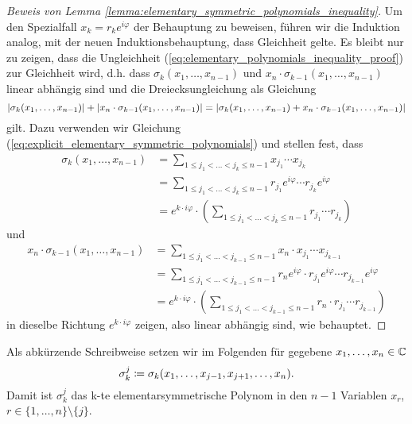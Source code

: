 \begin{proof}[Beweis von Lemma \ref{lemma:elementary_symmetric_polynomials_inequality}]
    Um den Spezialfall $x_k = r_k e^{i \varphi}$ der Behauptung zu beweisen,
    führen wir die Induktion analog, mit der neuen Induktionsbehauptung, dass
    Gleichheit gelte.  Es bleibt nur zu zeigen, dass die Ungleichheit
    (\ref{eq:elementary_polynomials_inequality_proof}) zur Gleichheit wird, d.h. dass
    $\sigma_{k}(x_1, \dots, x_{n-1})$ und $x_n \cdot \sigma_{k-1}(x_1, \dots, x_{n-1})$
    linear abhängig sind und die Dreiecksungleichung als Gleichung
    \[
        \left\lvert \sigma_{k}(x_1, \dots, x_{n-1}) \right\rvert + \left\lvert x_n \cdot \sigma_{k-1}(x_1, \dots, x_{n-1}) \right\rvert
        = \left\lvert \sigma_{k}(x_1, \dots, x_{n-1}) + x_n \cdot \sigma_{k-1}(x_1, \dots, x_{n-1}) \right\rvert
    \]
    gilt.
    Dazu verwenden wir Gleichung
    (\ref{eq:explicit_elementary_symmetric_polynomials}) und stellen fest, dass
    \begin{equation*}
        \begin{split}
            \sigma_{k}(x_1, \dots, x_{n-1})
            &= \sum_{1 \leq j_1 < \dots < j_k \leq n-1} x_{j_1} \cdots x_{j_k}\\
            &= \sum_{1 \leq j_1 < \dots < j_k \leq n-1} r_{j_1} e^{i\varphi} \cdots r_{j_k} e^{i\varphi}\\
            &= e^{k\cdot i\varphi} \cdot \left( \sum_{1 \leq j_1 < \dots < j_k \leq n-1} r_{j_1} \cdots r_{j_k} \right)
        \end{split}
    \end{equation*}
    und
    \begin{equation*}
        \begin{split}
            x_n \cdot \sigma_{k-1}(x_1, \dots, x_{n-1})
            &= \sum_{1 \leq j_1 < \dots < j_{k-1} \leq n-1} x_n \cdot x_{j_1} \cdots x_{j_{k-1}}\\
            &= \sum_{1 \leq j_1 < \dots < j_{k-1} \leq n-1} r_n e^{i\varphi} \cdot r_{j_1} e^{i\varphi} \cdots r_{j_{k-1}} e^{i\varphi}\\
            &= e^{k\cdot i\varphi} \cdot \left( \sum_{1 \leq j_1 < \dots < j_{k-1} \leq n-1} r_n \cdot r_{j_1} \cdots r_{j_{k-1}} \right)
        \end{split}
    \end{equation*}
    in dieselbe Richtung $e^{k\cdot i\varphi}$ zeigen, also linear abhängig sind, wie behauptet.
\end{proof}

\begin{notation}
    Als abkürzende Schreibweise setzen wir im Folgenden für gegebene $x_1, \dots, x_{n} \in \mathbb{C}$
    \[
        \sigma_{k}^{j} \coloneqq \sigma_{k}(x_1, \dots, x_{j-1}, x_{j+1}, \dots, x_{n}).
    \]
    Damit ist $\sigma_{k}^{j}$ das k-te elementarsymmetrische Polynom in den
    $n-1$ Variablen $x_r$, $r \in \{ 1, \dots, n \} \setminus \{ j \}$.
\end{notation}

